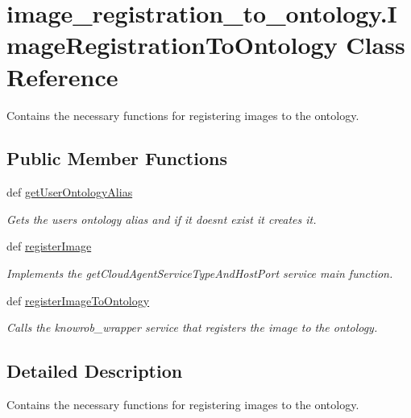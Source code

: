 \hypertarget{classimage__registration__to__ontology_1_1ImageRegistrationToOntology}{\section{image\-\_\-registration\-\_\-to\-\_\-ontology.\-Image\-Registration\-To\-Ontology Class Reference}
\label{classimage__registration__to__ontology_1_1ImageRegistrationToOntology}
}


Contains the necessary functions for registering images to the ontology.  


\subsection*{Public Member Functions}
\begin{DoxyCompactItemize}
\item 
def \hyperlink{classimage__registration__to__ontology_1_1ImageRegistrationToOntology_acbabf879634cf248ac60b92286c58fbf}{get\-User\-Ontology\-Alias}
\begin{DoxyCompactList}\small\item\em Gets the users ontology alias and if it doesnt exist it creates it. \end{DoxyCompactList}\item 
def \hyperlink{classimage__registration__to__ontology_1_1ImageRegistrationToOntology_a1597593051dfb3205ff16d9d8122ac57}{register\-Image}
\begin{DoxyCompactList}\small\item\em Implements the get\-Cloud\-Agent\-Service\-Type\-And\-Host\-Port service main function. \end{DoxyCompactList}\item 
def \hyperlink{classimage__registration__to__ontology_1_1ImageRegistrationToOntology_ae1dc2702a4f2a044360d6a64ac493133}{register\-Image\-To\-Ontology}
\begin{DoxyCompactList}\small\item\em Calls the knowrob\-\_\-wrapper service that registers the image to the ontology. \end{DoxyCompactList}\end{DoxyCompactItemize}


\subsection{Detailed Description}
Contains the necessary functions for registering images to the ontology. 

